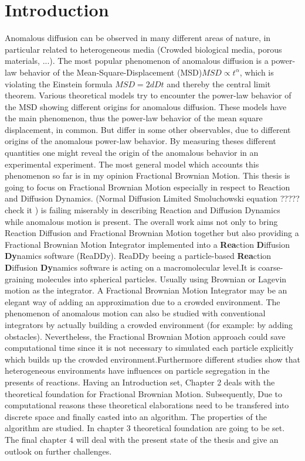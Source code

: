 \documentclass[
  a4paper,BCOR10mm,oneside,
  bibtotoc,idxtotoc,
  headsepline,footsepline,%
  fleqn,openbib
]{scrbook}
\begin{document}
\chapter{Introduction}
Anomalous diffusion can be observed in many different areas of nature, in particular related to heterogeneous media (Crowded biological media, porous materials, ...). The most popular phenomenon of anomalous diffusion is a power-law behavior of the Mean-Square-Displacement (MSD)$MSD\propto t^{\alpha}$, which is violating the Einstein formula $MSD=2 d D t$ and thereby the central limit theorem. Various theoretical models try to encounter the power-law behavior of the MSD showing different origins for anomalous diffusion. These models have the main phenomenon, thus the power-law behavior of the mean square displacement, in common. But differ in some other observables, due to different origins of the anomalous power-law behavior. By measuring theses different quantities one might reveal the origin of the anomalous behavior in an experimental experiment.\newline
The most general model which accounts this phenomenon so far is in my opinion Fractional Brownian Motion. This thesis is going to focus on Fractional Brownian Motion especially in respect to Reaction and Diffusion Dynamics. (Normal Diffusion Limited Smoluchowski equation ????? check it ) is failing miserably in describing Reaction and Diffusion Dynamics while anomalous motion is present. The overall work aims not only to bring Reaction Diffusion and Fractional Brownian Motion together but also providing a Fractional Brownian Motion Integrator implemented into a \textbf{Rea}ction \textbf{D}iffusion \textbf{Dy}namics software (ReaDDy). ReaDDy beeing a particle-based \textbf{Rea}ction \textbf{D}iffusion \textbf{Dy}namics software is acting on a macromolecular level.It is coarse-graining molecules into spherical particles. Usually using Brownian or Lagevin motion as the integrator. A Fractional Brownian Motion Integrator may be an elegant way of adding an approximation due to a crowded environment. The phenomenon of anomalous motion can also be studied with conventional integrators by actually building a crowded environment (for example: by adding obstacles). Nevertheless, the Fractional Brownian Motion approach could save computational time since it is not necessary to simulated each particle  explicitly which builds up the crowded environment.Furthermore different studies show that heterogeneous environments have influences on particle segregation in the presents of reactions.\newline
Having an Introduction set, Chapter 2 deals with the theoretical foundation for Fractional Brownian Motion. Subsequently, Due to computational reasons these theoretical elaborations need to be transfered into discrete space and finally casted into an algorithm. The properties of the algorithm are studied.
In chapter 3 theoretical foundation are going to be set. The final chapter 4 will deal with the present state of the thesis and give an outlook on further challenges.  
\end{document}
